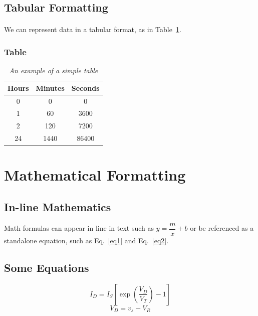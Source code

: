\documentclass[a4paper,10pt]{article}
\begin{document}
\subsection{Tabular Formatting}
\paragraph{} We can represent data in a tabular format, as in Table~\ref{table}.

\subsubsection{Table}
\begin{table}[!h]
\centering
	\begin{tabular}{|c|c|c|}
	\hline
    \textbf{Hours}& \textbf{Minutes}& \textbf{Seconds} \\ \hline
           0      &         0       &         0        \\ \hline
           1      &         60      &       3600       \\ \hline
           2      &        120      &       7200       \\ \hline
           24     &        1440     &       86400      \\ \hline
 
	\end{tabular}
	\caption{\textit{An example of a simple table}}
	\label{table}
\end{table}

\section{Mathematical Formatting}\label{math}
\subsection{In-line Mathematics}
Math formulas can appear in line in text such as $y= \dfrac{m}{x}+b$ or be referenced as a standalone equation, such as Eq.~\eqref{eq1} and Eq.~\eqref{eq2}.

\subsection{Some Equations}
	\begin{equation}\label{eq1}
	I_D = I_S \left[\exp\left(\dfrac{V_D}{V_T}\right)-1\right]
	\end{equation}
	\begin{equation}\label{eq2}
	V_D = v_s - V_R
	\end{equation}
\end{document}
